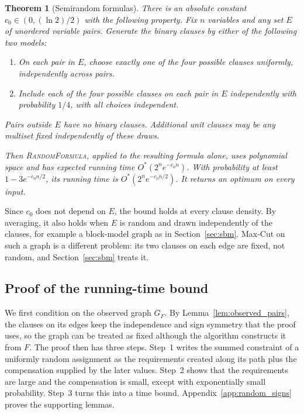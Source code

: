 \documentclass[11pt,a4paper]{article}
\newtheorem{theorem}{Theorem}[section]
\theoremstyle{definition}
\theoremstyle{remark}
\newcommand{\Ostar}{O^{*}}
\begin{document}
\begin{theorem}[Semirandom formulas]\label{thm:random_main}
There is an absolute constant $c_0\in(0,(\ln2)/2)$ with the following
property. Fix $n$ variables and any set $E$ of unordered variable pairs.
Generate the binary clauses by either of the following two models:
\begin{enumerate}
\item On each pair in $E$, choose exactly one of the four possible
clauses uniformly, independently across pairs.
\item Include each of the four possible clauses on each pair in $E$
independently with probability $1/4$, with all choices independent.
\end{enumerate}
Pairs outside $E$ have no binary clauses.
Additional unit clauses may be any multiset fixed independently of
these draws.

Then \textnormal{\textsc{RandomFormula}}, applied to the resulting formula
alone, uses polynomial space and has expected running time
$\Ostar(2^n e^{-c_0n})$. With probability at least $1-3e^{-c_0n/2}$,
its running time is $\Ostar(2^n e^{-c_0n/2})$.
It returns an optimum on every input.
\end{theorem}

Since $c_0$ does not depend on $E$, the bound holds at every clause
density. By averaging, it also holds when $E$ is random and drawn
independently of the clauses, for example a block-model graph as in
Section~\ref{sec:sbm}. Max-Cut on such a graph is a different problem: its
two clauses on each edge are fixed, not random, and Section~\ref{sec:sbm}
treats it.

\subsection{Proof of the running-time bound}

We first condition on the observed graph $G_F$. By
Lemma~\ref{lem:observed_pairs}, the clauses on its edges keep the
independence and sign symmetry that the proof uses, so the graph can be
treated as fixed although the algorithm constructs it from $F$. The proof
then has three steps. Step~1 writes the summed constraint of a uniformly
random assignment as the requirements created along its path plus the
compensation supplied by the later values. Step~2 shows that the
requirements are large and the compensation is small, except with
exponentially small probability. Step~3 turns this into a time bound.
Appendix~\ref{app:random_signs} proves the supporting lemmas.
\end{document}
